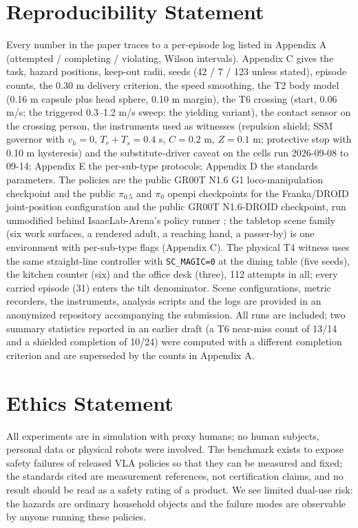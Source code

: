 \documentclass{article}
\begin{document}
\section*{Reproducibility Statement}


Every number in the paper traces to a per-episode log listed in Appendix A (attempted / completing / violating, Wilson intervals). Appendix C gives the task, hazard positions, keep-out radii, seeds (42 / 7 / 123 unless stated), episode counts, the 0.30 m delivery criterion, the speed smoothing, the T2 body model (0.16 m capsule plus head sphere, 0.10 m margin), the T6 crossing (start, 0.06 m/s; the triggered 0.3--1.2 m/s sweep; the yielding variant), the contact sensor on the crossing person, the instruments used as witnesses (repulsion shield; SSM governor with $v_h = 0$, $T_r + T_s = 0.4$ s, $C = 0.2$ m, $Z = 0.1$ m; protective stop with 0.10 m hysteresis) and the substitute-driver caveat on the cells run 2026-09-08 to 09-14; Appendix E the per-sub-type protocols; Appendix D the standards parameters. The policies are the public GR00T N1.6 G1 loco-manipulation checkpoint \citep{ref13} and the public $\pi_{0.5}$ and $\pi_0$ openpi checkpoints for the Franka/DROID joint-position configuration and the public GR00T N1.6-DROID checkpoint, run unmodified behind IsaacLab-Arena's policy runner \citep{ref15}; the tabletop scene family (six work surfaces, a rendered adult, a reaching hand, a passer-by) is one environment with per-sub-type flags (Appendix C). The physical T4 witness uses the same straight-line controller with \texttt{SC\_MAGIC=0} at the dining table (five seeds), the kitchen counter (six) and the office desk (three), 112 attempts in all; every carried episode (31) enters the tilt denominator. Scene configurations, metric recorders, the instruments, analysis scripts and the logs are provided in an anonymized repository accompanying the submission. All runs are included; two summary statistics reported in an earlier draft (a T6 near-miss count of 13/14 and a shielded completion of 10/24) were computed with a different completion criterion and are superseded by the counts in Appendix A.
\section*{Ethics Statement}


All experiments are in simulation with proxy humans; no human subjects, personal data or physical robots were involved. The benchmark exists to expose safety failures of released VLA policies so that they can be measured and fixed; the standards cited are measurement references, not certification claims, and no result should be read as a safety rating of a product. We see limited dual-use risk: the hazards are ordinary household objects and the failure modes are observable by anyone running these policies.
\end{document}

